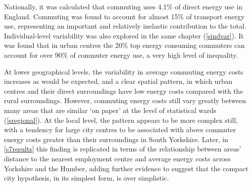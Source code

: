 Nationally, it was calculated that
commuting uses 4.1\% of direct energy use in England. Commuting was found to
account for almost 15\% of transport energy use, representing an
important and relatively inelastic contribution to the total.
Individual-level variability was also explored in the
same chapter (\cref{sindvar}). It was found that in urban centres
the 20\% top energy consuming commuters can account for over 90\% of commuter
energy use, a very high level of inequality.

At lower geographical levels, the variability in average commuting energy
costs increases as would be expected, and a clear spatial pattern, in which
urban centres and their direct surroundings have low energy costs compared
with the rural surroundings. However, commuting energy costs still vary
greatly between many areas that are similar `on paper' at the level of
statistical wards (\cref{sregional}). At the local level, the pattern appears
to be more complex still, with a tendency for large city centres to be associated
with above commuter energy costs greater than their surroundings in South
Yorkshire. Later, in \cref{c7results} this finding is replicated in terms
of the relationship between areas' distance to the nearest employment
centre and average energy costs across Yorkshire and the Humber, adding
further evidence to suggest that the compact city hypothesis, in its simplest
form, is over simplistic. 

